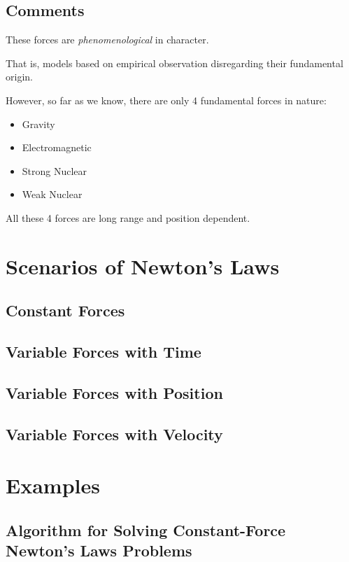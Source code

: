 \subsection{Comments}

These forces are \textit{phenomenological} in character.

That is, models based on empirical observation disregarding their fundamental origin.

However, so far as we know, there are only 4 fundamental forces in nature:

\begin{itemize}
	\item Gravity
	\item Electromagnetic
	\item Strong Nuclear
	\item Weak Nuclear
\end{itemize}

All these 4 forces are long range and position dependent.

\section{Scenarios of Newton's Laws}

\subsection{Constant Forces}

\subsection{Variable Forces with Time}

\subsection{Variable Forces with Position}

\subsection{Variable Forces with Velocity}

\section{Examples}

\subsection{Algorithm for Solving Constant-Force Newton's Laws Problems}


